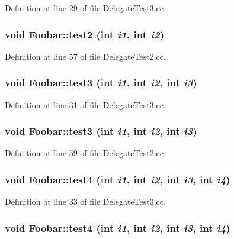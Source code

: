 Definition at line 29 of file Delegate\-Test3.cc.\hypertarget{structFoobar_a2}{
\subsubsection[test2]{\setlength{\rightskip}{0pt plus 5cm}void Foobar::test2 (int {\em i1}, int {\em i2})}}
\label{structFoobar_a2}




Definition at line 57 of file Delegate\-Test2.cc.\hypertarget{structFoobar_a14}{
\subsubsection[test3]{\setlength{\rightskip}{0pt plus 5cm}void Foobar::test3 (int {\em i1}, int {\em i2}, int {\em i3})}}
\label{structFoobar_a14}




Definition at line 31 of file Delegate\-Test3.cc.\hypertarget{structFoobar_a3}{
\subsubsection[test3]{\setlength{\rightskip}{0pt plus 5cm}void Foobar::test3 (int {\em i1}, int {\em i2}, int {\em i3})}}
\label{structFoobar_a3}




Definition at line 59 of file Delegate\-Test2.cc.\hypertarget{structFoobar_a15}{
\subsubsection[test4]{\setlength{\rightskip}{0pt plus 5cm}void Foobar::test4 (int {\em i1}, int {\em i2}, int {\em i3}, int {\em i4})}}
\label{structFoobar_a15}




Definition at line 33 of file Delegate\-Test3.cc.\hypertarget{structFoobar_a4}{
\subsubsection[test4]{\setlength{\rightskip}{0pt plus 5cm}void Foobar::test4 (int {\em i1}, int {\em i2}, int {\em i3}, int {\em i4})}}
\label{structFoobar_a4}




